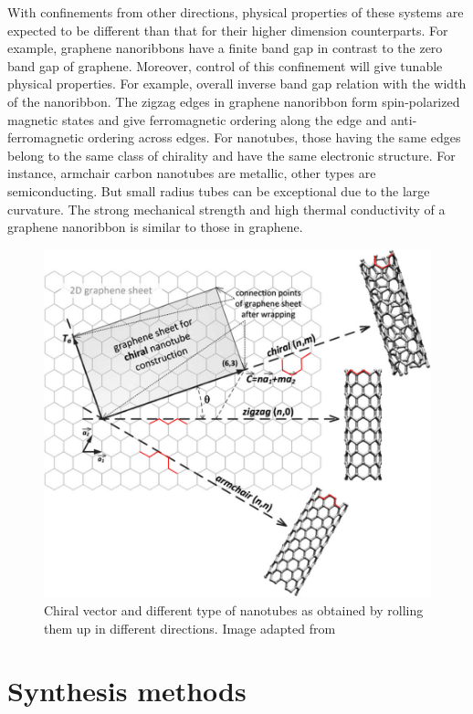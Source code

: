 With confinements from other directions, physical properties of these systems are expected to be different than that for their higher dimension counterparts. For example, graphene nanoribbons have a finite band gap in contrast to the zero band gap of graphene\cite{Wang2008}. Moreover, control of this confinement will give tunable physical properties. For example, overall inverse band gap relation with the width of the nanoribbon\cite{Han2007}. The zigzag edges in graphene nanoribbon form spin-polarized magnetic states and give ferromagnetic ordering along the edge and anti-ferromagnetic ordering across edges\cite{Son2006}. For nanotubes, those having the same edges belong to the same class of chirality and have the same electronic structure. For instance, armchair carbon nanotubes are metallic, other types are semiconducting. But small radius tubes can be exceptional due to the large curvature\cite{Bandaru2007}.  The strong mechanical strength and high thermal conductivity of a graphene nanoribbon is similar to those in graphene.

\begin{figure}[htbp!] 
\centering  
\includegraphics[width=\textwidth]{chiral_vector.png}
\caption{Chiral vector and different type of nanotubes as obtained by rolling them up in different directions. Image adapted from \cite{Prasek2011}}  
\label{fig:chiral}
\end{figure} 

\section{Synthesis methods}

